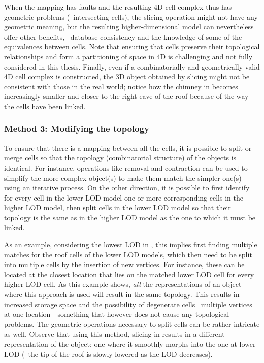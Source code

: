 When the mapping has faults and the resulting 4D cell complex thus has geometric problems (\eg\ intersecting cells), the slicing operation might not have any geometric meaning, but the resulting higher-dimensional model can nevertheless offer other benefits, \eg\ database consistency and the knowledge of some of the equivalences between cells.
Note that ensuring that cells preserve their topological relationships and form a partitioning of space in 4D is challenging and not fully considered in this thesis.
Finally, even if a combinatorially and geometrically valid 4D cell complex is constructed, the 3D object obtained by slicing might not be consistent with those in the real world; notice how the chimney in  becomes increasingly smaller and closer to the right eave of the roof because of the way the cells have been linked.

\subsubsection{Method 3: Modifying the topology}
\label{sss:method3}

To ensure that there is a mapping between all the cells, it is possible to split or merge cells so that the topology (combinatorial structure) of the objects is identical.
For instance, operations like removal and contraction \citep{Damiand03} can be used to simplify the more complex object(s) to make them match the simpler one(s) using an iterative process.
On the other direction, it is possible to first identify for every cell in the lower LOD model one or more corresponding cells in the higher LOD model, then split cells in the lower LOD model so that their topology is the same as in the higher LOD model as the one to which it must be linked.

As an example, considering the lowest LOD in , this implies first finding multiple matches for the roof cells of the lower LOD models, which then need to be split into multiple cells by the insertion of new vertices.
For instance, these can be located at the closest location that lies on the matched lower LOD cell for every higher LOD cell.
As this example shows, \emph{all} the representations of an object where this approach is used will result in the same topology.
This results in increased storage space and the possibility of degenerate cells \eg\ multiple vertices at one location---something that however does not cause any topological problems.
The geometric operations necessary to split cells can be rather intricate as well.
Observe that using this method, slicing in  results in a different representation of the object: one where it smoothly morphs into the one at lower LOD (\eg\ the tip of the roof is slowly lowered as the LOD decreases).

